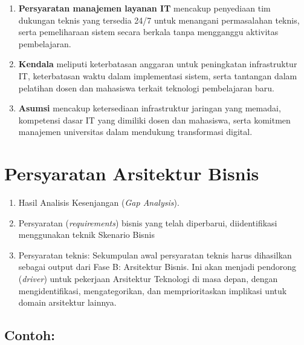 \begin{enumerate}
\item
\textbf{Persyaratan manajemen layanan IT }mencakup penyediaan tim dukungan teknis yang tersedia 24/7 untuk menangani permasalahan teknis, serta pemeliharaan sistem secara berkala tanpa mengganggu aktivitas pembelajaran.

\item
\textbf{Kendala} meliputi keterbatasan anggaran untuk peningkatan infrastruktur IT, keterbatasan waktu dalam implementasi sistem, serta tantangan dalam pelatihan dosen dan mahasiswa terkait teknologi pembelajaran baru.

\item
\textbf{Asumsi} mencakup ketersediaan infrastruktur jaringan yang memadai, kompetensi dasar IT yang dimiliki dosen dan mahasiswa, serta komitmen manajemen universitas dalam mendukung transformasi digital.

\end{enumerate}

\section{Persyaratan Arsitektur Bisnis}
\begin{enumerate}
	\item Hasil Analisis Kesenjangan (\textit{Gap Analysis}).
	\item Persyaratan (\textit{requirements}) bisnis yang telah diperbarui, diidentifikasi menggunakan teknik Skenario Bisnis
	\item Persyaratan teknis: Sekumpulan awal persyaratan teknis harus dihasilkan sebagai output dari Fase B: Arsitektur Bisnis. Ini akan menjadi pendorong (\textit{driver}) untuk pekerjaan Arsitektur Teknologi di masa depan, dengan mengidentifikasi, mengategorikan, dan memprioritaskan implikasi untuk domain arsitektur lainnya.
\end{enumerate}

\subsection*{Contoh:}

